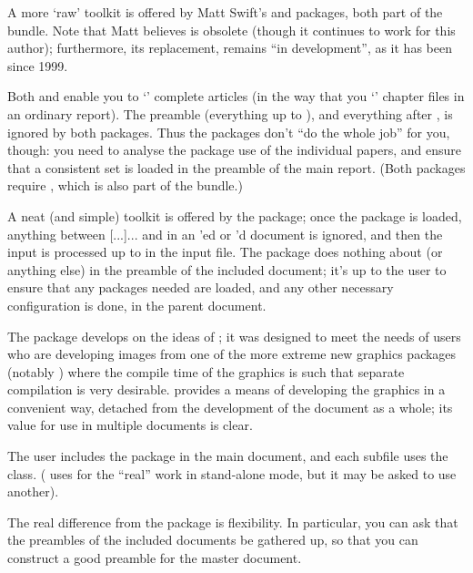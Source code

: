 A more `raw' toolkit is offered by Matt Swift's  and
 packages, both part of the 
bundle.  Note that Matt believes  is obsolete
(though it continues to work for this author); furthermore, its
replacement,  remains ``in development'', as it has
been since 1999.

Both  and  enable you to
`' complete articles (in the way that you
`' chapter files in an ordinary report).  The preamble
(everything up to ), and everything after
, is ignored by both packages.  Thus the
packages don't ``do the whole job'' for you, though: you need to
analyse the package use of the individual papers, and ensure that a
consistent set is loaded in the preamble of the main report.  (Both
packages require , which is also part of the
bundle.)

A neat (and simple) toolkit is offered by the
 package; once the package is loaded, anything
between [...]{...} and
 in an 'ed or 'd
document is ignored, and then the input is processed up to
 in the input file.  The package does nothing
about  (or anything else) in the preamble of the
included document; it's up to the user to ensure that any packages
needed are loaded, and any other necessary configuration is done, in
the parent document.

The  package develops on the ideas of
; it was designed to meet the needs of users who are
developing images from one of the more extreme new graphics packages
(notably ) where the compile time of the graphics is
such that separate compilation is very desirable.
 provides a means of developing the graphics in a
convenient way, detached from the development of the document as a
whole; its value for use in multiple documents is clear.

The user includes the  package in the main
document, and each subfile uses the  class.
( uses  for the ``real'' work in
stand-alone mode, but it may be asked to use another).

The real difference from the  package is
flexibility.  In particular, you can ask that the preambles of the
included documents be gathered up, so that you can construct a good
preamble for the master document.

